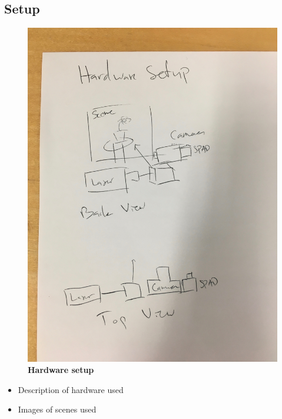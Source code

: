 
\subsection{Setup}
\begin{figure}
  \includegraphics[width=\textwidth/2]{sections/figures/hardware.jpeg}
  \caption{\textbf{Hardware setup}}
\end{figure}
\begin{itemize}
  \item{Description of hardware used}
  \item{Images of scenes used}
\end{itemize}
